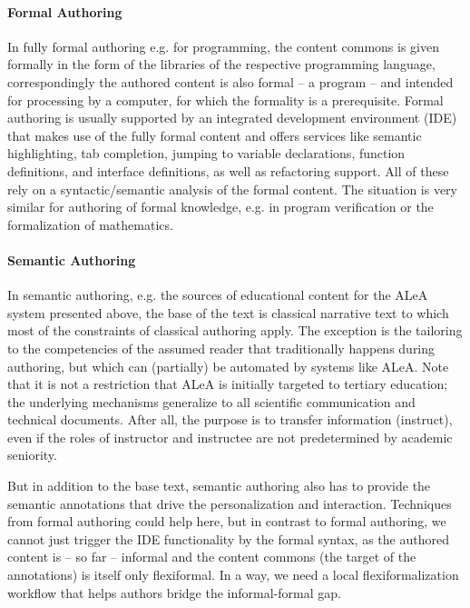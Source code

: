 \documentclass{llncs}
\newcommand\ALeA{\textsf{ALeA}\xspace}
\begin{document}
\paragraph{Formal Authoring}
In fully formal authoring e.g. for programming, the content commons is given formally in
the form of the libraries of the respective programming language, correspondingly the
authored content is also formal -- a program -- and intended for processing by a computer,
for which the formality is a prerequisite. Formal authoring is usually supported by an
integrated development environment (IDE) that makes use of the fully formal content and
offers services like semantic highlighting, tab completion, jumping to variable
declarations, function definitions, and interface definitions, as well as refactoring
support. All of these rely on a syntactic/semantic analysis of the formal content. The
situation is very similar for authoring of formal knowledge, e.g. in program verification
or the formalization of mathematics.

\paragraph{Semantic Authoring}
In semantic authoring, e.g. the \sTeX sources of educational content for the \ALeA system
presented above, the base of the text is classical narrative text to which most of the
constraints of classical authoring apply.
The exception is the tailoring to the competencies of the assumed reader
that traditionally happens during authoring, but which can (partially) be automated by systems like
\ALeA. Note that it is not a restriction that \ALeA is initially targeted to tertiary
education; the underlying mechanisms generalize to all scientific communication and
technical documents. After all, the purpose is to transfer information (instruct), even if
the roles of instructor and instructee are not predetermined by academic seniority.

But in addition to the base text, semantic authoring also has to provide the semantic
annotations that drive the personalization and interaction. Techniques from formal
authoring could help here, but in contrast to formal authoring, we cannot just trigger the
IDE functionality by the formal syntax, as the authored content is -- so far -- informal
and the content commons (the target of the annotations) is itself only flexiformal. In a
way, we need a local flexiformalization workflow that helps authors bridge the
informal-formal gap.
\end{document}
